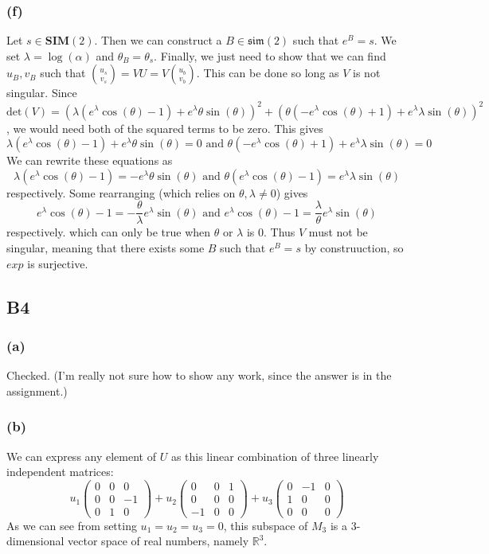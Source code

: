 \documentclass{article}
\newcommand{\reals}{\mathbb{R}}
\newcommand{\threematrix}[9]{\left(\begin{array}{ccc} #1 & #2 & #3\\ #4 & #5 & #6 \\ #7 & #8 & #9 \end{array}\right)}
\begin{document}
\subsubsection{(f)}
Let $s \in \textbf{SIM}(2)$. Then we can construct a $B \in \mathfrak{sim}(2)$ such that $e^B = s$.
We set $\lambda = \log(\alpha)$ and $\theta_B = \theta_s$.
Finally, we just need to show that we can find $u_B, v_B$ such that $ \binom{u_s}{v_s} = VU = V\binom{u_b}{v_b}$.
This can be done so long as $V$ is not singular.
Since 
$\text{det}(V) = \left(\lambda(e^\lambda\cos(\theta) - 1) + e^\lambda \theta \sin(\theta)\right)^2 + 
 \left(\theta(-e^\lambda\cos(\theta) + 1) + e^\lambda \lambda \sin(\theta)\right)^2 $, we would need both of the squared terms to be zero.
 This gives \[ \lambda(e^\lambda\cos(\theta) - 1) + e^\lambda \theta \sin(\theta) = 0 \text{ and }
 \theta(-e^\lambda\cos(\theta) + 1) + e^\lambda \lambda \sin(\theta) = 0 \]
 We can rewrite these equations as \[ \lambda(e^\lambda\cos(\theta) - 1) = - e^\lambda \theta \sin(\theta) \text{ and }
 \theta(e^\lambda\cos(\theta) - 1) = e^\lambda \lambda \sin(\theta) \] respectively.
 Some rearranging (which relies on $\theta, \lambda \neq 0$) gives
 \[ e^\lambda\cos(\theta) - 1 = -\frac{\theta}{\lambda} e^\lambda \sin(\theta) \text{ and }
 e^\lambda\cos(\theta) - 1 = \frac{\lambda}{\theta}e^\lambda \sin(\theta) \] respectively.
 which can only be true when $\theta$ or $\lambda$ is 0.
 Thus $V$ must not be singular, meaning that there exists some $B$ such that
 $e^B = s$ by construuction, so $exp$ is surjective.

\subsection{B4}
\subsubsection{(a)} Checked. (I'm really not sure how to show any work, since the answer is in the assignment.)
\subsubsection{(b)}
We can express any element of $U$ as this linear combination of three linearly independent matrices:
\[ u_1\threematrix{0}{0}{0}{0}{0}{-1}{0}{1}{0} + 
   u_2\threematrix{0}{0}{1}{0}{0}{0} {-1}{0} {0} +
   u_3\threematrix{0}{-1}{0}{1}{0}{0}{0}{0}{0} \]
As we can see from setting $u_1 = u_2 = u_3 = 0$, this subspace of $M_3$ is a 3-dimensional vector space of real numbers, namely $\reals^3$.
\end{document}
